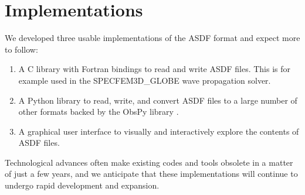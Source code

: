 \section{Implementations}

We developed three usable implementations of the ASDF format and expect more to
follow:

\begin{enumerate}
    \item A C library with Fortran bindings to read and write ASDF files. This
        is for example used in the SPECFEM3D\_GLOBE
        \cite{KoTr02a, KoTr02b} wave propagation solver.
    \item A Python library to read, write, and convert ASDF files to a large
        number of other formats backed by the ObsPy library \cite{Megies2011,
        krischer2015}.
    \item A graphical user interface to visually and interactively explore the
        contents of ASDF files.
\end{enumerate}

Technological advances often make existing codes and tools obsolete in a matter
of just a few years, and we anticipate that these implementations will continue
to undergo rapid development and expansion.
